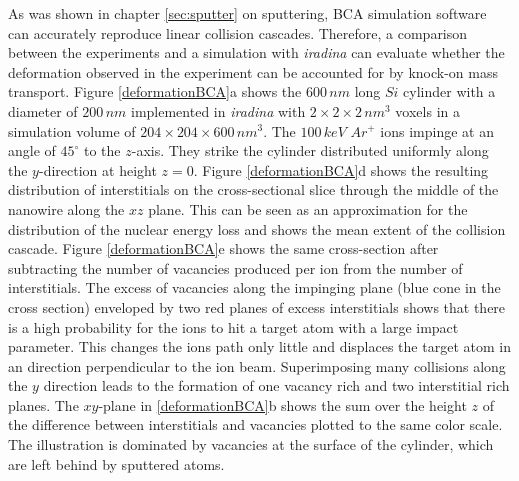 As was shown in chapter \ref{sec:sputter} on sputtering, BCA simulation software can accurately reproduce linear collision cascades. Therefore, a comparison between the experiments and a simulation with \emph{iradina} can evaluate whether the deformation observed in the experiment can be accounted for by knock-on mass transport. Figure \ref{deformationBCA}a shows the $600\,nm$ long $Si$ cylinder with a diameter of $200\,nm$ implemented in \emph{iradina} with $2\times2\times2\,nm^3$ voxels in a simulation volume of $204\times204\times600\,nm^3$. The $100\,keV\,\,Ar^+$ ions impinge at an angle of $45^\circ$ to the $z$-axis. They strike the cylinder distributed uniformly along the $y$-direction at height $z=0$. Figure \ref{deformationBCA}d shows the resulting distribution of interstitials on the cross-sectional slice through the middle of the nanowire along the $xz$ plane. This can be seen as an approximation for the distribution of the nuclear energy loss and shows the mean extent of the collision cascade. Figure \ref{deformationBCA}e shows the same cross-section after subtracting the number of vacancies produced per ion from the number of interstitials. The excess of vacancies along the impinging plane (blue cone in the cross section) enveloped by two red planes of excess interstitials shows that there is a high probability for the ions to hit a target atom with a large impact parameter. This changes the ions path only little and displaces the target atom in an direction perpendicular to the ion beam. Superimposing many collisions along the $y$ direction leads to the formation of one vacancy rich and two interstitial rich planes. The $xy$-plane in \ref{deformationBCA}b shows the sum over the height $z$ of the difference between interstitials and vacancies plotted to the same color scale. The illustration is dominated by vacancies at the surface of the cylinder, which are left behind by sputtered atoms. 

